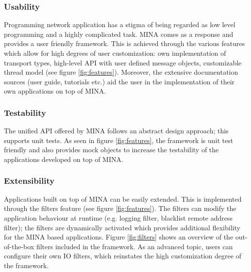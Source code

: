 \subsubsection{Usability}
Programming network application has a stigma of being regarded as low level programming and a highly complicated task. MINA comes as a response and provides a user friendly framework. This is achieved through the various features which allow for high degrees of user customization: own implementation of transport types, high-level API with user defined message objects, customizable thread model (see figure \ref{fig:features}). Moreover, the extensive documentation sources (user guide, tutorials etc.) aid the user in the implementation of their own applications on top of MINA.






\subsubsection{Testability}
The unified API offered by MINA follows an abstract design approach; this supports unit tests. As seen in figure \ref{fig:features}, the framework is unit test friendly and also provides mock objects to increase the testability of the applications developed on top of MINA.


\subsubsection{Extensibility}
Applications built on top of MINA can be easily extended. This is implemented through the filters feature (see figure \ref{fig:features}). The filters can modify the application behaviour at runtime (e.g. logging filter, blacklist remote address filter); the filters are dynamically activated which provides additional flexibility for the MINA based applications. Figure \ref{fig:filters} shows an overview of the out-of-the-box filters included in the framework. As an advanced topic, users can configure their own IO filters, which reinstates the high customization degree of the framework.


